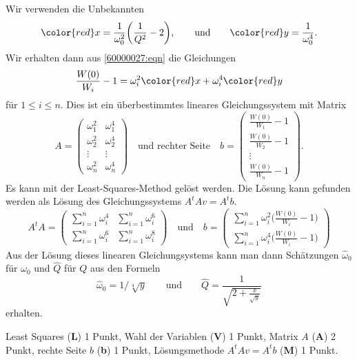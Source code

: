 \begin{loesung}
Wir verwenden die Unbekannten 
\[
{\color{red}x}=\frac{1}{\omega_0^2}\biggl(\frac{1}{Q^2}-2 \biggr),
\qquad\text{und}\qquad
{\color{red}y}=\frac{1}{\omega_0^4}.
\]
Wir erhalten dann aus \eqref{60000027:eqn} die Gleichungen
\begin{equation}
\frac{W(0)}{W_i}-1
=
\omega_i^2 {\color{red}x}
+
\omega_i^4 {\color{red}y}
\end{equation}
für $1\le i\le n$.
Dies ist ein überbestimmtes lineares Gleichungssystem mit Matrix
\[
A=\begin{pmatrix}
\omega_1^2&\omega_1^4\\
\omega_2^2&\omega_2^4\\
\vdots   &\vdots    \\
\omega_n^2&\omega_n^4
\end{pmatrix}
\quad\text{und rechter Seite}\quad
b=\begin{pmatrix}
\frac{W(0)}{W_1}-1\\
\frac{W(0)}{W_2}-1\\
\vdots\\
\frac{W(0)}{W_n}-1
\end{pmatrix}.
\]
Es kann mit der Least-Squares-Method gelöst werden.
Die Lösung kann gefunden werden als Lösung des Gleichungssystems
$A^tAv=A^tb$.
\[
A^tA
=
\begin{pmatrix}
\displaystyle\sum_{i=1}^n \omega_i^4 & \displaystyle\sum_{i=1}^n \omega_i^6 \\
\displaystyle\sum_{i=1}^n \omega_i^6 & \displaystyle\sum_{i=1}^n \omega_i^8
\end{pmatrix}
\quad\text{und}\quad
b
=
\begin{pmatrix}
\displaystyle\sum_{i=1}^n \omega_i^2 \biggl(\frac{W(0)}{W_i}-1\biggr) \\
\displaystyle\sum_{i=1}^n \omega_i^4 \biggl(\frac{W(0)}{W_i}-1\biggr)
\end{pmatrix}
\]
Aus der Lösung dieses linearen Gleichungsystems kann man dann 
Schätzungen $\hat{\omega}_0$ für $\omega_0$ und $\hat{Q}$ für $Q$
aus den Formeln
\[
\hat{\omega}_0
=
1/\sqrt[4]{y}
\qquad\text{und}\qquad
\hat{Q}
=
\frac1{\displaystyle\sqrt{2+\frac{x}{\sqrt{y}}}}
\]
erhalten.
\end{loesung}

\begin{bewertung}
Least Squares ({\bf L}) 1 Punkt,
Wahl der Variablen ({\bf V}) 1 Punkt,
Matrix $A$ ({\bf A}) 2 Punkt,
rechte Seite $b$ ({\bf b}) 1 Punkt,
Lösungsmethode $A^tAv=A^tb$ ({\bf M}) 1 Punkt.
\end{bewertung}

